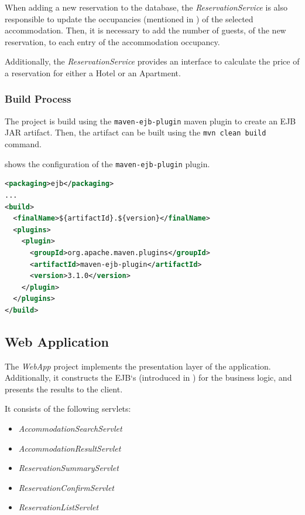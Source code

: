 When adding a new reservation to the database, the \textit{ReservationService} is also responsible to update the occupancies (mentioned in ) of the selected accommodation. Then, it is necessary to add the number of guests, of the new reservation, to each entry of the accommodation occupancy.

Additionally, the \textit{ReservationService} provides an interface to calculate the price of a reservation for either a Hotel or an Apartment.

\newpage
\subsubsection{Build Process}\label{sec:02_design_beans_build}
The project is build using the \texttt{maven-ejb-plugin} maven plugin to create an EJB JAR artifact.
Then, the artifact can be built using the \texttt{mvn clean build} command.

 shows the configuration of the \texttt{maven-ejb-plugin} plugin.
\begin{lstlisting}[label=lst:02_design_ejb_buildprocess_pluginconfig, caption=\texttt{maven-ejb-plugin} plugin configuration, language=xml]
<packaging>ejb</packaging>
...
<build>
  <finalName>${artifactId}.${version}</finalName>
  <plugins>
    <plugin>
      <groupId>org.apache.maven.plugins</groupId>
      <artifactId>maven-ejb-plugin</artifactId>
      <version>3.1.0</version>
    </plugin>
  </plugins>
</build>
\end{lstlisting}



\subsection{Web Application}\label{sec:02_design_web}
The \textit{WebApp} project implements the presentation layer of the application. Additionally, it constructs the EJB`s (introduced in ) for the business logic, and presents the results to the client.
 
It consists of the following servlets:
\begin{itemize}
\item \textit{AccommodationSearchServlet}
\item \textit{AccommodationResultServlet}
\item \textit{ReservationSummaryServlet}
\item \textit{ReservationConfirmServlet}
\item \textit{ReservationListServlet}
\end{itemize}

